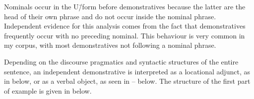 \begin{exe}
	\label{ex:120715-4, 0.05}
	\label{ex:130906-1, 2.48}
	\label{ex:120923-2, 5.03}
		\label{tr:120923-2, 5.03}
\end{exe}

Nominals occur in the U\=/form before demonstratives
because the latter are the head of their own phrase
and do not occur inside the nominal phrase.
Independent evidence for this analysis comes from the fact that
demonstratives frequently occur with no preceding nominal.
This behaviour is very common in my corpus,
with most demonstratives not following a nominal phrase.

Depending on the discourse pragmatics and syntactic structures of the entire sentence,
an independent demonstrative is interpreted as a locational adjunct, as in  below,
or as  a verbal object, as seen in -- below.
The structure of the first part of example 
is given in  below.

